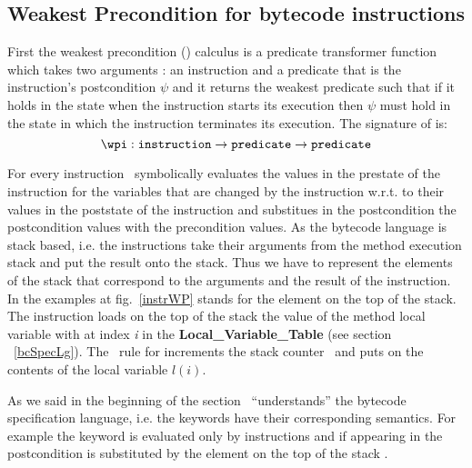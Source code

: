 \subsection{Weakest Precondition for bytecode instructions}\label{wpInstr}
First the weakest precondition (\wpi) calculus is a predicate transformer function which takes two arguments : an instruction and a predicate that is the instruction's postcondition $\psi$ and it returns the weakest predicate such that if it holds in the state when the instruction starts its execution then $\psi$ must hold in the state in which the instruction terminates its execution. The signature of \wpi is:
$$\wpi : \texttt{instruction} \rightarrow \texttt{predicate} \rightarrow \texttt{predicate}  $$

For every instruction \wpi \ symbolically evaluates the values in the prestate of the instruction for the variables that are changed by the instruction w.r.t. to their values in the poststate of the instruction and substitues in the postcondition the postcondition values with the precondition values. As the bytecode language is stack based, i.e. the instructions take their arguments from the method execution stack and put the result onto the stack. Thus we have to represent the elements of the stack that correspond to the arguments and the result of the instruction. In the examples at fig.~\ref{instrWP} \stack{\counter} stands for the element on the top of the stack. The instruction  loads on the top of the stack the value of the method local variable with at index \textit{i} in the \textbf{Local\_Variable\_Table} (see section ~\ref{bcSpecLg}). The \wpi \ rule for   increments the stack counter \counter \ and puts on \stack{\counter} the contents of the local variable $l(i)$.


As we said in the beginning of the section \wpi \ ``understands'' the bytecode specification language, i.e. the keywords have their corresponding semantics. For example the keyword  is evaluated only by  instructions and if appearing in the postcondition   is substituted by the element on the top of the stack \stack{\counter}. 

